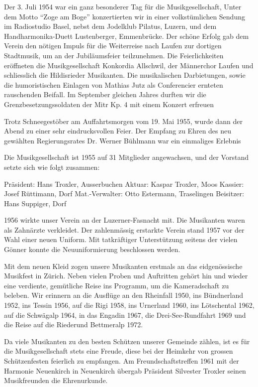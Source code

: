 \begin{history}
    Der 3. Juli 1954 war ein ganz besonderer Tag für die Musikgesellschaft,
    Unter dem Motto \enquote{Zoge am Boge} konzertierten wir in einer
    volkstümlichen Sendung im Radiostudio Basel, nebst dem Jodelklub Pilatus,
    Luzern, und dem Handharmonika-Duett Lustenberger, Emmenbrücke. Der schöne
    Erfolg gab dem Verein den nötigen Impuls für die Weiterreise nach Laufen zur
    dortigen Stadtmusik, um an der Jubiläumsfeier teilzunehmen. Die
    Feierlichkeiten eröffneten die Musikgesellschaft Konkordia Allschwil, der
    Männerchor Laufen und schliesslich die Hildisrieder Musikanten. Die
    musikalischen Darbietungen, sowie die humoristischen Einlagen von Mathias
    Jutz als Conferencier ernteten rauschenden Beifall. Im September gleichen
    Jahres durften wir die Grenzbesetzungssoldaten der Mitr Kp. 4 mit einem
    Konzert erfreuen

    Trotz Schneegestöber am Auffahrtsmorgen vom 19. Mai 1955, wurde dann der
    Abend zu einer sehr eindrucksvollen Feier. Der Empfang zu Ehren des neu
    gewählten Regierungsrates Dr. Werner Bühlmann war ein einmaliges Erlebnis

    Die Musikgesellschaft ist 1955 auf 31 Mitglieder angewachsen, und der
    Vorstand setzte sich wie folgt zusammen:

    Präsident: Hans Troxler, Ausserbuchen Aktuar: Kaspar Troxler, Moos Kassier:
    Josef Rüttimann, Dorf Mat.-Verwalter: Otto Estermann, Traselingen Beisitzer:
    Hans Suppiger, Dorf

    1956 wirkte unser Verein an der Luzerner-Fasnacht mit. Die Musikanten waren
    als Zahnärzte verkleidet. Der zahlenmässig erstarkte Verein stand 1957 vor
    der Wahl einer neuen Uniform. Mit tatkräftiger Unterstützung seitens der
    vielen Gönner konnte die Neuuniformierung beschlossen werden.

    Mit dem neuen Kleid zogen unsere Musikanten erstmals an das eidgenössische
    Musikfest in Zürich. Neben vielen Proben und Auftritten gehört hin und
    wieder eine verdiente, gemütliche Reise ins Programm, um die Kameradschaft
    zu beleben. Wir erinnern an die Ausflüge an den Rheinfall 1950, ins
    Bündnerland 1952, ins Tessin 1956, auf die Rigi 1958, ins Urnerland 1960,
    ins Lötschental 1962, auf die Schwägalp 1964, in das Engadin 1967, die
    Drei-See-Rundfahrt 1969 und die Reise auf die Riederund Bettmeralp 1972.

    Da viele Musikanten zu den besten Schützen unserer Gemeinde zählen, ist es
    für die Musikgesellschaft stets eine Freude, diese bei der Heimkehr von
    grossen Schützenfesten feierlich zu empfangen. Am Freundschaftstreffen 1961
    mit der Harmonie Neuenkirch in Neuenkirch übergab Präsident Silvester
    Troxler seinen Musikfreunden die Ehrenurkunde.


\end{history}
